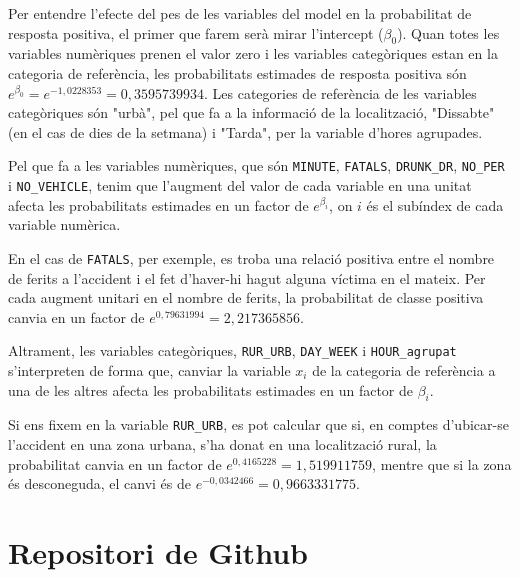 \documentclass[12pt,longbibliography]{article}
\theoremstyle{definition}
\theoremstyle{remark}
\begin{document}
Per entendre l'efecte del pes de les variables del model en la probabilitat de resposta positiva, el primer que farem serà mirar l'intercept ($\beta_0$). Quan totes les variables numèriques prenen el valor zero i les variables categòriques estan en la categoria de referència, les probabilitats estimades de resposta positiva són $e^{\beta_0} = e^{-1,0228353} = 0,3595739934$. Les categories de referència de les variables categòriques són "urbà", pel que fa a la informació de la localització, "Dissabte" (en el cas de dies de la setmana) i "Tarda", per la variable d'hores agrupades.

Pel que fa a les variables numèriques, que són \texttt{MINUTE}, \texttt{FATALS}, \texttt{DRUNK\_DR}, \texttt{NO\_PER} i \texttt{NO\_VEHICLE}, tenim que l'augment del valor de cada variable en una unitat afecta les probabilitats estimades en un factor de $e^{\beta_i}$, on $i$ és el subíndex de cada variable numèrica.


En el cas de \texttt{FATALS}, per exemple, es troba una relació positiva entre el nombre de ferits a l'accident i el fet d'haver-hi hagut alguna víctima en el mateix. Per cada augment unitari en el nombre de ferits, la probabilitat de classe positiva canvia en un factor de $e^{0,79631994} = 2,217365856$.


Altrament, les variables categòriques, \texttt{RUR\_URB}, \texttt{DAY\_WEEK} i \texttt{HOUR\_agrupat} s'interpreten de forma que, canviar la variable $x_i$ de la categoria de referència a una de les altres afecta les probabilitats estimades en un factor de $\beta_i$.


Si ens fixem en la variable \texttt{RUR\_URB}, es pot calcular que si, en comptes d'ubicar-se l'accident en una zona urbana, s'ha donat en una localització rural, la probabilitat canvia en un factor de $e^{0,4165228} = 1,519911759$, mentre que si la zona és desconeguda, el canvi és de $e^{-0,0342466} = 0,9663331775$.


\newpage

\section{Repositori de Github}

\newpage

\listoffigures

\newpage

\listoftables
\end{document}
